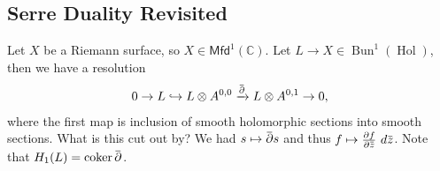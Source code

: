 \hypertarget{serre-duality-revisited}{%
\subsection{Serre Duality Revisited}\label{serre-duality-revisited}}

\begin{remark}

Let \(X\) be a Riemann surface, so
\(X\in {\mathsf{Mfd}}^1({\mathbb{C}})\). Let
\(L\to X \in \mathop{\mathrm{Bun}}^1(\mathop{\mathrm{Hol}})\), then we
have a resolution
\begin{align*}
0 \to L \hookrightarrow L\otimes A^{0, 0} \xrightarrow{\mkern 1.5mu\overline{\mkern-1.5mu{\partial}\mkern-1.5mu}\mkern 1.5mu} L \otimes A^{0, 1} \to 0
,\end{align*}
where the first map is inclusion of smooth holomorphic sections into
smooth sections. What is this cut out by? We had
\(s\mapsto \mkern 1.5mu\overline{\mkern-1.5mu{\partial}\mkern-1.5mu}\mkern 1.5mus\)
and thus
\(f \mapsto {\frac{\partial f}{\partial \mkern 1.5mu\overline{\mkern-1.5muz\mkern-1.5mu}\mkern 1.5mu }\,} \,d\mkern 1.5mu\overline{\mkern-1.5muz\mkern-1.5mu}\mkern 1.5mu\).
Note that
\(H_1(L) = \operatorname{coker}\mkern 1.5mu\overline{\mkern-1.5mu{\partial}\mkern-1.5mu}\mkern 1.5mu\).

\end{remark}

